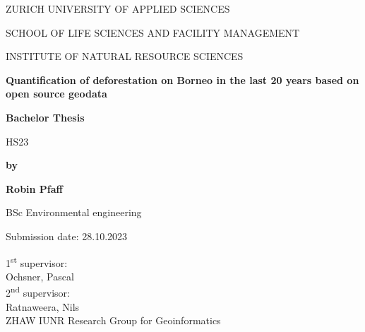 \begin{titlepage}
    \centering
    {\fontsize{12}{10}\selectfont ZURICH UNIVERSITY OF APPLIED SCIENCES\par}
    {\fontsize{12}{10}\selectfont SCHOOL OF LIFE SCIENCES AND FACILITY MANAGEMENT\par}
    {\fontsize{12}{10}\selectfont INSTITUTE OF NATURAL RESOURCE SCIENCES\par}
    \vspace{6cm}
    {\fontsize{14}{16}\bfseries Quantification of deforestation on Borneo in the last 20 years based on open source geodata\par}
    {\fontsize{12}{14}\bfseries Bachelor Thesis\par}
    {\fontsize{12}{14}\selectfont HS23\par}
    \vspace{2cm}
    {\fontsize{12}{14}\bfseries by\par}
    {\fontsize{12}{14}\bfseries Robin Pfaff\par}
    {\fontsize{12}{14}\selectfont BSc Environmental engineering\par}
    \vspace{2cm}
    {\fontsize{12}{14}\selectfont Submission date: 28.10.2023\par}

    \vfill
    \begin{flushleft}
        1\textsuperscript{st} supervisor:\\
        Ochsner, Pascal\\
        2\textsuperscript{nd} supervisor:\\
        Ratnaweera, Nils\\
        ZHAW IUNR Research Group for Geoinformatics
    \end{flushleft}
\end{titlepage}

\clearpage
{}
\setcounter{page}{1}